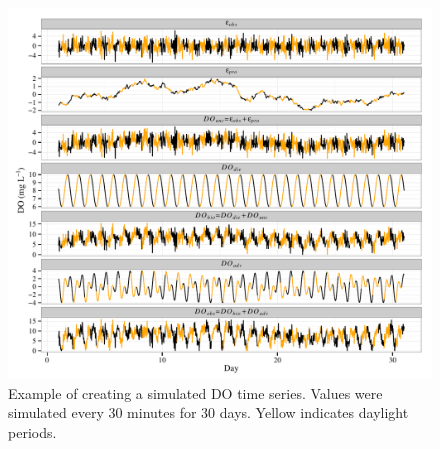 \documentclass[letterpaper,12pt,oneside]{article}\usepackage[]{graphicx}\usepackage[]{color}
\makeatletter
\def\maxwidth{ %
  \ifdim\Gin@nat@width>\linewidth
    \linewidth
  \else
    \Gin@nat@width
  \fi
}
\newenvironment{knitrout}{}{} %
\makeatother
\begin{document}
\centering\vspace*{\fill}
\begin{knitrout}
\color{fgcolor}\begin{figure}[!ht]


{\centering \includegraphics[width=\maxwidth]{figure/do_sim} 

}

\caption[Example of creating a simulated \ac{DO} time series]{Example of creating a simulated \ac{DO} time series.  Values were simulated every 30 minutes for 30 days.  Yellow indicates daylight periods.\label{fig:do_sim}}
\end{figure}


\end{knitrout}
\vfill
\clearpage
\end{document}
